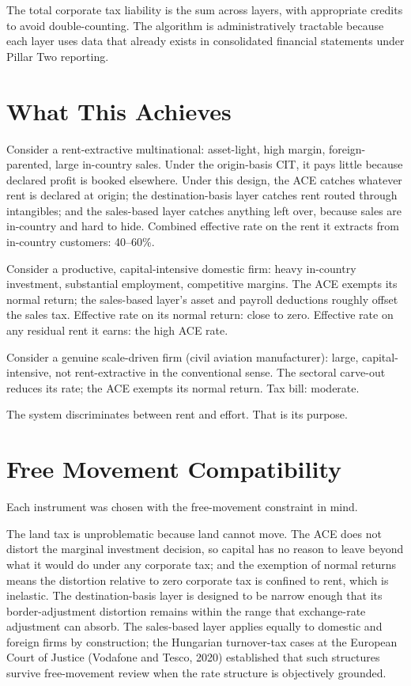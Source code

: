\documentclass[11pt,a4paper]{article}
\begin{document}
The total corporate tax liability is the sum across layers, with appropriate credits to avoid double-counting. The algorithm is administratively tractable because each layer uses data that already exists in consolidated financial statements under Pillar Two reporting.

\section{What This Achieves}

Consider a rent-extractive multinational: asset-light, high margin, foreign-parented, large in-country sales. Under the origin-basis CIT, it pays little because declared profit is booked elsewhere. Under this design, the ACE catches whatever rent is declared at origin; the destination-basis layer catches rent routed through intangibles; and the sales-based layer catches anything left over, because sales are in-country and hard to hide. Combined effective rate on the rent it extracts from in-country customers: 40--60\%.

Consider a productive, capital-intensive domestic firm: heavy in-country investment, substantial employment, competitive margins. The ACE exempts its normal return; the sales-based layer's asset and payroll deductions roughly offset the sales tax. Effective rate on its normal return: close to zero. Effective rate on any residual rent it earns: the high ACE rate.

Consider a genuine scale-driven firm (civil aviation manufacturer): large, capital-intensive, not rent-extractive in the conventional sense. The sectoral carve-out reduces its rate; the ACE exempts its normal return. Tax bill: moderate.

The system discriminates between rent and effort. That is its purpose.

\section{Free Movement Compatibility}

Each instrument was chosen with the free-movement constraint in mind.

The land tax is unproblematic because land cannot move. The ACE does not distort the marginal investment decision, so capital has no reason to leave beyond what it would do under any corporate tax; and the exemption of normal returns means the distortion relative to zero corporate tax is confined to rent, which is inelastic. The destination-basis layer is designed to be narrow enough that its border-adjustment distortion remains within the range that exchange-rate adjustment can absorb. The sales-based layer applies equally to domestic and foreign firms by construction; the Hungarian turnover-tax cases at the European Court of Justice (Vodafone and Tesco, 2020) established that such structures survive free-movement review when the rate structure is objectively grounded.
\end{document}
